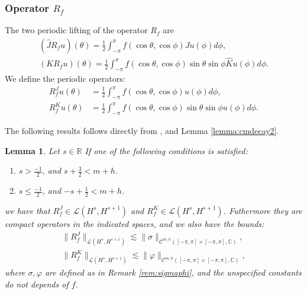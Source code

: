 \documentclass{article}
\newtheorem{lemma}[theorem]{Lemma}
\newcommand{\IC}{{\mathbb C}}
\newcommand{\IR}{{\mathbb R}}
\newcommand{\cmspaceh}[4]{\mathcal{C}^{#1,#2} \left( #3, #4 \right)}
\begin{document}
\subsubsection{Operator $R_f$}
The two periodic lifting of the operator $R_f$ are 
\begin{align*}
(\widehat{J}R_f u)(\theta) = \frac{1}{2}\int_{-\pi}^{\pi} f(\cos \theta, \cos \phi) Ju(\phi) d \phi,\\
(K R_f u)(\theta) = \frac{1}{2}\int_{-\pi}^{\pi} f(\cos \theta, \cos \phi) \sin \theta \sin \phi  \widehat{K}u(\phi) d \phi.
\end{align*}
We define the periodic operators:
\begin{align*}
R_f^J u(\theta)  &= \frac{1}{2}\int_{-\pi}^{\pi} f(\cos \theta, \cos \phi) u(\phi) d \phi, \\
R_f^K u (\theta) &= \frac{1}{2}\int_{-\pi}^{\pi} f(\cos \theta, \cos \phi) \sin \theta \sin \phi  u(\phi) d \phi.
\end{align*}

The following results follows directly from \cite[Theorem 6.1.1]{saranen2013periodic}, and Lemma \ref{lemma:cmdecay2}.
\begin{lemma}
\label{lemma:rfper}
Let $s \in \IR$ If one of the following conditions is satisfied: 
\begin{enumerate}
\item $s> \frac{-1}{2}$, and $s + \frac{3}{2} < m+h$.
\item $ s \leq \frac{-1}{2}$, and $-s+ \frac{1}{2} <m+h$. 
\end{enumerate} 
we have that $ R_f^J  \in \mathcal{L}(H^{s},H^{s+1})$ and  $R^K_f  \in \mathcal{L}(H^{s},H^{s+1})$. Futhermore they are compact operators in the indicated spaces, and we also have the bounds: 
\begin{align*}
\| R_f^J\|_{ \mathcal{L}(H^{s},H^{s+1})} \lesssim \|\sigma\|_{\cmspaceh{m}{h}{[-\pi,\pi]\times[-\pi,\pi]}{\IC}},\\
\| R_f^K\|_{ \mathcal{L}(H^{s},H^{s+1})} \lesssim \|\varphi\|_{\cmspaceh{m}{h}{[-\pi,\pi]\times[-\pi,\pi]}{\IC}},
\end{align*}
where $\sigma, \varphi$ are defined as in Remark \ref{rem:sigmaphi}, and the unspecified constants do not depends of $f$.
\end{lemma}
\end{document}
